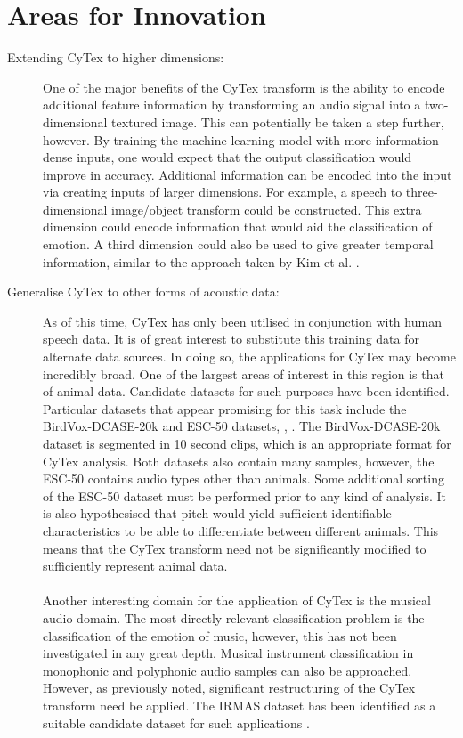 \section{Areas for Innovation}
\begin{description}
\item[Extending CyTex to higher dimensions:]
One of the major benefits of the CyTex transform is the ability to encode additional feature information by transforming an audio signal into a two-dimensional textured image. This can potentially be taken a step further, however. By training the machine learning model with more information dense inputs, one would expect that the output classification would improve in accuracy. Additional information can be encoded into the input via creating inputs of larger dimensions. For example, a speech to three-dimensional image/object transform could be constructed. This extra dimension could encode information that would aid the classification of emotion. A third dimension could also be used to give greater temporal information, similar to the approach taken by Kim et al. \cite{kim2017speech}.

\item[Generalise CyTex to other forms of acoustic data:]
As of this time, CyTex has only been utilised in conjunction with human speech data. It is of great interest to substitute this training data for alternate data sources. In doing so, the applications for CyTex may become incredibly broad. One of the largest areas of interest in this region is that of animal data. Candidate datasets for such purposes have been identified. Particular datasets that appear promising for this task include the BirdVox-DCASE-20k and ESC-50 datasets, \cite{lostanlen_vincent_2018_1208080}, \cite{piczak2015dataset}. The BirdVox-DCASE-20k dataset is segmented in 10 second clips, which is an appropriate format for CyTex analysis. Both datasets also contain many samples, however, the ESC-50 contains audio types other than animals. Some additional sorting of the ESC-50 dataset must be performed prior to any kind of analysis. It is also hypothesised that pitch would yield sufficient identifiable characteristics to be able to differentiate between different animals. This means that the CyTex transform need not be significantly modified to sufficiently represent animal data. 
\\ \\
Another interesting domain for the application of CyTex is the musical audio domain. The most directly relevant classification problem is the classification of the emotion of music, however, this has not been investigated in any great depth. Musical instrument classification in monophonic and polyphonic audio samples can also be approached. However, as previously noted, significant restructuring of the CyTex transform need be applied. The IRMAS dataset has been identified as a suitable candidate dataset for such applications \cite{bosch2012comparison}.
\end{description}


